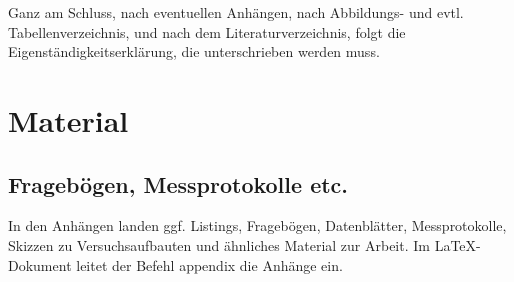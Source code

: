 Ganz am Schluss, nach eventuellen Anhängen, nach Abbildungs- und evtl. Tabellenverzeichnis, und nach dem Literaturverzeichnis, folgt die Eigenständigkeitserklärung, die unterschrieben werden muss.


\appendix
\chapter{Material}

\section{Fragebögen, Messprotokolle etc.}
In den Anhängen landen ggf. Listings, Fragebögen, Datenblätter, Messprotokolle, Skizzen zu Versuchsaufbauten und ähnliches Material zur Arbeit. Im \LaTeX-Dokument leitet der Befehl appendix die Anhänge ein.




\listoffigures %
\listoftables %


